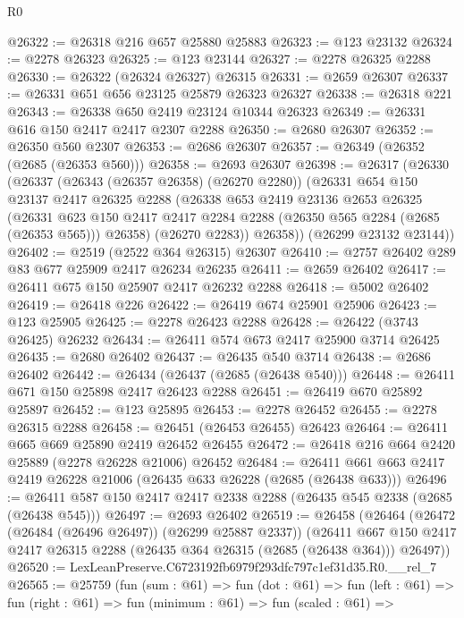 \begin{lexlean}{R0}
\begin{coremodule}
@26322 := @26318 @216 @657 @25880 @25883
@26323 := @123 @23132
@26324 := @2278 @26323
@26325 := @123 @23144
@26327 := @2278 @26325 @2288
@26330 := @26322 (@26324 @26327) @26315
@26331 := @2659 @26307
@26337 := @26331 @651 @656 @23125 @25879 @26323 @26327
@26338 := @26318 @221
@26343 := @26338 @650 @2419 @23124 @10344 @26323
@26349 := @26331 @616 @150 @2417 @2417 @2307 @2288
@26350 := @2680 @26307
@26352 := @26350 @560 @2307
@26353 := @2686 @26307
@26357 := @26349 (@26352 (@2685 (@26353 @560)))
@26358 := @2693 @26307
@26398 := @26317
    (@26330
      (@26337
        (@26343 (@26357 @26358) (@26270 @2280))
        (@26331
          @654
          @150
          @23137
          @2417
          @26325
          @2288
          (@26338
            @653
            @2419
            @23136
            @2653
            @26325
            (@26331
              @623
              @150
              @2417
              @2417
              @2284
              @2288
              (@26350 @565 @2284 (@2685 (@26353 @565)))
              @26358)
            (@26270 @2283))
          @26358))
      (@26299 @23132 @23144))
@26402 := @2519 (@2522 @364 @26315) @26307
@26410 := @2757 @26402 @289 @83 @677 @25909 @2417 @26234 @26235
@26411 := @2659 @26402
@26417 := @26411 @675 @150 @25907 @2417 @26232 @2288
@26418 := @5002 @26402
@26419 := @26418 @226
@26422 := @26419 @674 @25901 @25906
@26423 := @123 @25905
@26425 := @2278 @26423 @2288
@26428 := @26422 (@3743 @26425) @26232
@26434 := @26411 @574 @673 @2417 @25900 @3714 @26425
@26435 := @2680 @26402
@26437 := @26435 @540 @3714
@26438 := @2686 @26402
@26442 := @26434 (@26437 (@2685 (@26438 @540)))
@26448 := @26411 @671 @150 @25898 @2417 @26423 @2288
@26451 := @26419 @670 @25892 @25897
@26452 := @123 @25895
@26453 := @2278 @26452
@26455 := @2278 @26315 @2288
@26458 := @26451 (@26453 @26455) @26423
@26464 := @26411 @665 @669 @25890 @2419 @26452 @26455
@26472 := @26418 @216 @664 @2420 @25889 (@2278 @26228 @21006) @26452
@26484 := @26411 @661 @663 @2417 @2419 @26228 @21006 (@26435 @633 @26228 (@2685 (@26438 @633)))
@26496 := @26411 @587 @150 @2417 @2417 @2338 @2288 (@26435 @545 @2338 (@2685 (@26438 @545)))
@26497 := @2693 @26402
@26519 := @26458
    (@26464
      (@26472 (@26484 (@26496 @26497)) (@26299 @25887 @2337))
      (@26411 @667 @150 @2417 @2417 @26315 @2288 (@26435 @364 @26315 (@2685 (@26438 @364))) @26497))
@26520 := LexLeanPreserve.C6723192fb6979f293dfc797c1ef31d35.R0.__rel_7
@26565 := @25759
    (fun (sum : @61) =>
    fun (dot : @61) =>
    fun (left : @61) =>
    fun (right : @61) =>
    fun (minimum : @61) =>
    fun (scaled : @61) =>

\end{coremodule}
\end{lexlean}
